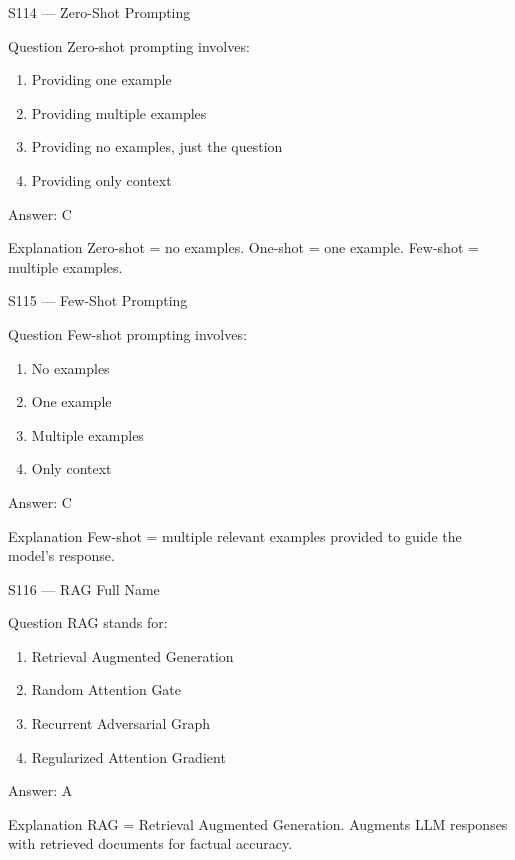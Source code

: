 \documentclass[aspectratio=169,8pt]{beamer}
\begin{document}
	\begin{frame}{S114 --- Zero-Shot Prompting}
		\begin{block}{Question}
			Zero-shot prompting involves:
			\begin{enumerate}
				\item Providing one example
				\item Providing multiple examples
				\item Providing no examples, just the question
				\item Providing only context
			\end{enumerate}
		\end{block}
		\begin{exampleblock}{Answer: C}\end{exampleblock}
		\begin{block}{Explanation}
			Zero-shot = no examples. One-shot = one example. Few-shot = multiple examples.
		\end{block}
	\end{frame}
	
	\begin{frame}{S115 --- Few-Shot Prompting}
		\begin{block}{Question}
			Few-shot prompting involves:
			\begin{enumerate}
				\item No examples
				\item One example
				\item Multiple examples
				\item Only context
			\end{enumerate}
		\end{block}
		\begin{exampleblock}{Answer: C}\end{exampleblock}
		\begin{block}{Explanation}
			Few-shot = multiple relevant examples provided to guide the model's response.
		\end{block}
	\end{frame}
	
	\begin{frame}{S116 --- RAG Full Name}
		\begin{block}{Question}
			RAG stands for:
			\begin{enumerate}
				\item Retrieval Augmented Generation
				\item Random Attention Gate
				\item Recurrent Adversarial Graph
				\item Regularized Attention Gradient
			\end{enumerate}
		\end{block}
		\begin{exampleblock}{Answer: A}\end{exampleblock}
		\begin{block}{Explanation}
			RAG = Retrieval Augmented Generation. Augments LLM responses with retrieved documents for factual accuracy.
		\end{block}
	\end{frame}
	
\end{document}
